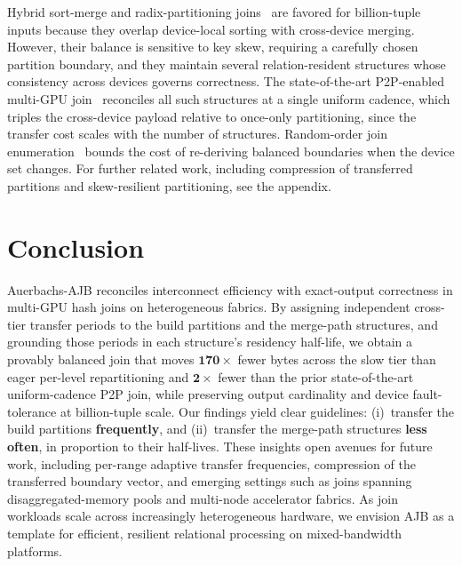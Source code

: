 \documentclass{article}
\begin{document}
Hybrid sort-merge and radix-partitioning joins~\citep{sioulas2019hardware} are
favored for billion-tuple inputs because they overlap device-local sorting with
cross-device merging. However, their balance is sensitive to key skew, requiring
a carefully chosen partition boundary, and they maintain several
relation-resident structures whose consistency across devices governs
correctness. The state-of-the-art P2P-enabled multi-GPU
join~\citep{maltry2025multigpu} reconciles all such structures at a single
uniform cadence, which triples the cross-device payload relative to once-only
partitioning, since the transfer cost scales with the number of structures.
Random-order join enumeration~\citep{chen2023renum} bounds the cost of
re-deriving balanced boundaries when the device set changes. For further related
work, including compression of transferred partitions and skew-resilient
partitioning, see the appendix.

\section{Conclusion}
\label{sec:conclusion}

Auerbachs-AJB reconciles interconnect efficiency with exact-output correctness in
multi-GPU hash joins on heterogeneous fabrics. By assigning independent
cross-tier transfer periods to the build partitions and the merge-path
structures, and grounding those periods in each structure's residency half-life,
we obtain a provably balanced join that moves $\mathbf{170\times}$ fewer bytes
across the slow tier than eager per-level repartitioning and $\mathbf{2\times}$
fewer than the prior state-of-the-art uniform-cadence P2P join, while preserving
output cardinality and device fault-tolerance at billion-tuple scale. Our
findings yield clear guidelines: (i)~transfer the build partitions
\textbf{frequently}, and (ii)~transfer the merge-path structures \textbf{less
often}, in proportion to their half-lives. These insights open avenues for future
work, including per-range adaptive transfer frequencies, compression of the
transferred boundary vector, and emerging settings such as joins spanning
disaggregated-memory pools and multi-node accelerator fabrics. As join workloads
scale across increasingly heterogeneous hardware, we envision AJB as a template
for efficient, resilient relational processing on mixed-bandwidth platforms.
\end{document}
